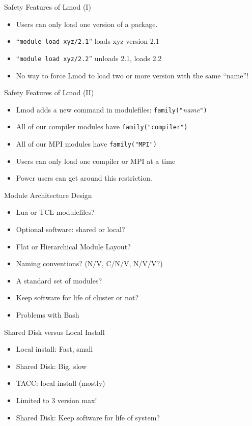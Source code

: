 \documentclass{beamer}
\begin{document}
\begin{frame}{Safety Features of Lmod (I)}
  \begin{itemize}
    \item Users can only load one version of a package.
    \item ``\texttt{module load xyz/2.1}'' loads xyz version 2.1
    \item ``\texttt{module load xyz/2.2}'' unloads 2.1, loads 2.2
    \item No way to force Lmod to load two or more version with the
      same ``name''!
  \end{itemize}
\end{frame}

\begin{frame}{Safety Features of Lmod (II)}
  \begin{itemize}
    \item Lmod adds a new command in modulefiles: \texttt{family("}\emph{name}\texttt{")}
    \item All of our compiler modules have \texttt{family("compiler")}
    \item All of our MPI modules have \texttt{family("MPI")}
    \item Users can only load one compiler or MPI at a time
    \item Power users can get around this restriction.
  \end{itemize}
\end{frame}

\begin{frame}{Module Architecture Design}
  \begin{itemize}
    \item Lua or TCL modulefiles?
    \item Optional software: shared or local?
    \item Flat or Hierarchical Module Layout?
    \item Naming conventions? (N/V, C/N/V, N/V/V?)
    \item A standard set of modules?
    \item Keep software for life of cluster or not?
    \item Problems with Bash
  \end{itemize}
\end{frame}

\begin{frame}{Shared Disk versus Local Install}
  \begin{itemize}
    \item Local install: Fast, small 
    \item Shared Disk: Big, slow
    \item TACC: local install (mostly)
    \item Limited to 3 version max!
    \item Shared Disk: Keep software for life of system?
  \end{itemize}
\end{frame}
\end{document}
